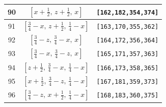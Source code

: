 \documentclass[fleqn,8pt]{jsarticle}
\begin{document}
\begin{longtable}{ccc}
90 & $\left[ x + \frac{1}{2},\, z + \frac{1}{2},\, x \right]$ & {\tt [162,182,354,374]} \\ \hline
91 & $\left[ \frac{3}{4} - x,\, z + \frac{1}{2},\, \frac{1}{4} - x \right]$ & {\tt [163,170,355,362]} \\ \hline
92 & $\left[ \frac{3}{4} - z,\, \frac{3}{4} - x,\, x \right]$ & {\tt [164,172,356,364]} \\ \hline
93 & $\left[ \frac{3}{4} - x,\, \frac{3}{4} - z,\, x \right]$ & {\tt [165,171,357,363]} \\ \hline
94 & $\left[ z + \frac{1}{2},\, \frac{3}{4} - x,\, \frac{1}{4} - x \right]$ & {\tt [166,173,358,365]} \\ \hline
95 & $\left[ x + \frac{1}{2},\, \frac{3}{4} - z,\, \frac{1}{4} - x \right]$ & {\tt [167,181,359,373]} \\ \hline
96 & $\left[ \frac{3}{4} - z,\, x + \frac{1}{2},\, \frac{1}{4} - x \right]$ & {\tt [168,183,360,375]} \\
\end{longtable}
\renewcommand{\arraystretch}{1.2}
\end{document}
